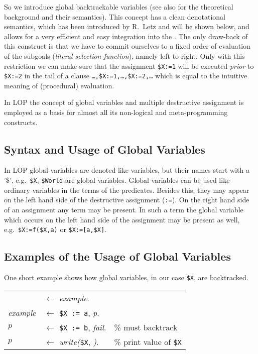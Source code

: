 So we introduce global backtrackable variables
(see also \cite{LS88} for the theoretical background and their semantics). 
This concept has a clean denotational
semantics, which has been introduced by R.~Letz and will be shown below,
and allows for a very efficient and easy integration into 
the \SAM.
The only draw-back of this construct is that we have to commit ourselves
to a fixed order of evaluation of the subgoals
({\em literal selection function}),
namely left-to-right. Only with this restriction we can make sure
that the assignment {\tt \$X:=1} will be executed
{\em prior\/} to {\tt \$X:=2} in the tail of
a clause {\tt \ldots,\$X:=1,\ldots,\$X:=2,\ldots} which is
equal to the intuitive meaning of (procedural) evaluation.

In LOP the concept of global variables and multiple destructive assignment
is employed as a basis for almost all its non-logical and
meta-programming constructs.


\subsection{Syntax and Usage of Global Variables}

In LOP global variables are denoted like variables, but their names
start with a '\$', e.g.\ {\tt \$X}, {\tt \$World}
are global variables.
Global variables can be used like ordinary variables in the terms
of the predicates. Besides this, they may appear on the left hand side
of the destructive assignment ({\tt :=}).
On the right hand side of an assignment any term may be present.
In such a term the global variable which occurs on the left hand side
of the assignment may be present as well,  e.g.\
{\tt \$X:=f(\$X,a)} or {\tt \$X:=[a,\$X]}.

\subsection{Examples of the Usage of Global Variables}
One short example shows how global variables, in our case {\tt \$X},
are backtracked.

\begin{center}
\begin{tabular}{lll}
& $\leftarrow$ {\em example}.& \\
 {\em example} & $\leftarrow$ {\tt \$X := a}, {\em p}.& \\
$p$ & $\leftarrow$ {\tt \$X := b}, {\em fail}.& \% must backtrack\\
$p$ & $\leftarrow$ {\em write(\/}{\tt \$X}, {\em )}.& \% print value of {\tt \$X}
\end{tabular}
\end{center}

